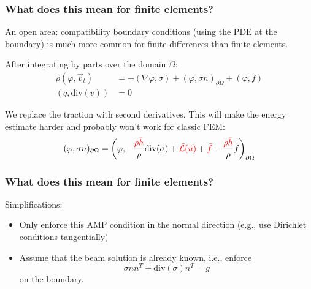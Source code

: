 \documentclass[8pt]{beamer}
\newcommand{\leftd}[1]{{\color{red} \bar{#1}}}
\newcommand{\leftdd}[2]{{\color{red} \bar{#1}(\bar{#2})}}
\newcommand{\divergence}{\mathrm{div}}
\begin{document}
\begin{frame}
    \frametitle{What does this mean for finite elements?}
    An open area: compatibility boundary conditions (using the PDE at the
    boundary) is much more common for finite differences than finite elements.

    \pause
    \vspace{0.5in}
    After integrating by parts over the domain \(\Omega\):
    \begin{align}
        \rho (\varphi, \vec{v}_t) &= -(\nabla \varphi, \sigma)
        + (\varphi, \sigma n)_{\partial \Omega}
        + (\varphi, f)                                                        \\
        (q, \divergence(v)) &= 0
    \end{align}

    We replace the traction with second derivatives. This will make the
    energy estimate harder and probably won't work for classic FEM:
    \begin{equation}
        (\varphi, \sigma n)_{\partial \Omega} = \left(\varphi,
        - \dfrac{\leftd{\rho} \leftd{h}}{\rho} \divergence(\sigma)
        + \leftdd{\mathcal{L}}{u}
        + \leftd{f}
        - \dfrac{\leftd{\rho} \leftd{h}}{\rho} f\right)_{\partial \Omega}
    \end{equation}
\end{frame}

\begin{frame}
    \frametitle{What does this mean for finite elements?}
    Simplifications:
    \begin{itemize}
        \item Only enforce this AMP condition in the normal direction (e.g., use
              Dirichlet conditions tangentially)
        \item Assume that the beam solution is already known, i.e., enforce
              \begin{equation}
                  \sigma n n^T + \divergence(\sigma) n^T = g
              \end{equation}
              on the boundary.
    \end{itemize}
\end{frame}
\end{document}
